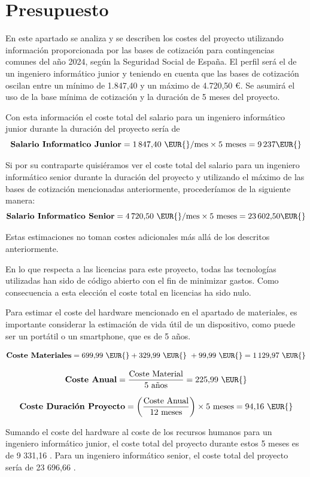 \section{Presupuesto}

En este apartado se analiza y se describen los costes del proyecto utilizando información proporcionada por las bases de cotización para contingencias comunes del año 2024, según la Seguridad Social de España. El perfil será el de un ingeniero informático junior y teniendo en cuenta que las bases de cotización oscilan entre un mínimo de 1.847,40 \EUR{} y un máximo de 4.720,50 €. Se asumirá el uso de la base mínima de cotización y la duración de 5 meses del proyecto. \cite{seguridad_social}

Con esta información el coste total del salario para un ingeniero informático junior durante la duración del proyecto sería de
\[
    \textbf{Salario Informatico Junior} = 1\,847{,}40 \text{ \EUR{}/mes} \times 5 \text{ meses} = 9\,237 \text{\EUR{}}
\]


Si por su contraparte quisiéramos ver el coste total del salario para un ingeniero informático senior durante la duración del proyecto y utilizando el máximo de las bases de cotización mencionadas anteriormente, procederíamos de la siguiente manera:
\[
    \textbf{Salario Informatico Senior} = 4\,720{,}50 \text{ \EUR{}/mes} \times 5 \text{ meses} = 23\,602{,}50 \text{\EUR{}}
\]

Estas estimaciones no toman costes adicionales más allá de los descritos anteriormente.

En lo que respecta a las licencias para este proyecto, todas las tecnologías utilizadas han sido de código abierto con el fin de minimizar gastos. Como consecuencia a esta elección el coste total en licencias ha sido nulo.

Para estimar el coste del hardware mencionado en el apartado de materiales, es importante considerar la estimación de vida útil de un dispositivo, como puede ser un portátil o un smartphone, que es de 5 años.

\[
    \textbf{Coste Materiales} = 699{,}99 \text{ \EUR{}} + 329{,}99 \text{ \EUR{} } + 99{,}99 \text{ \EUR{}} = 1\,129{,}97 \text{ \EUR{}}
\]

\[
    \textbf{Coste Anual} = \frac{\text{Coste Material}}{5 \text{ años}} = 225{,}99 \text{ \EUR{}}
\]

\[
    \textbf{Coste Duración Proyecto} = \left( \frac{\text{Coste Anual}}{12 \text{ meses}} \right) \times 5 \text{ meses} = 94{,}16 \text{ \EUR{}}
\]

Sumando el coste del hardware al coste de los recursos humanos para un ingeniero informático junior, el coste total del proyecto durante estos 5 meses es de 9 331,16 \EUR{}. Para un ingeniero informático senior, el coste total del proyecto sería de 23 696,66 \EUR{}.

